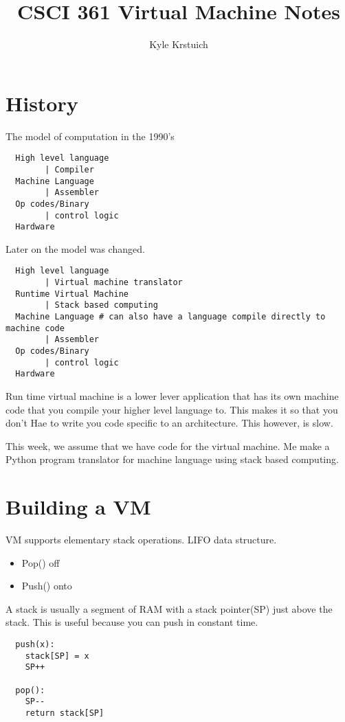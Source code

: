 \documentclass[12pt]{article}
\title{CSCI 361 Virtual Machine Notes}
\author{
  Kyle Krstuich
}
\begin{document}
\maketitle


\section*{History}

The model of computation in the 1990's
\begin{verbatim}
  High level language
        | Compiler
  Machine Language
        | Assembler
  Op codes/Binary
        | control logic
  Hardware
\end{verbatim}

Later on the model was changed.
\begin{verbatim}
  High level language
        | Virtual machine translator
  Runtime Virtual Machine
        | Stack based computing
  Machine Language # can also have a language compile directly to machine code
        | Assembler
  Op codes/Binary
        | control logic
  Hardware
\end{verbatim}
Run time virtual machine is a lower lever application that has its own machine
code that you compile your higher level language to. This makes it so that you
don't Hae to write you code specific to an architecture. This however, is slow. 

This week, we assume that we have code for the virtual machine. Me make a
Python program translator for machine language using stack based computing. 

\clearpage

\section*{Building a VM}
VM supports elementary stack operations. LIFO data structure.
\begin{itemize}
  \item
    Pop() off

  \item
    Push() onto
\end{itemize}
A stack is usually a segment of RAM with a stack pointer(SP) just above the
stack. This is useful because you can push in constant time.

\begin{verbatim}
  push(x):
    stack[SP] = x
    SP++

  pop():
    SP--
    return stack[SP]
\end{verbatim}
\end{document}
